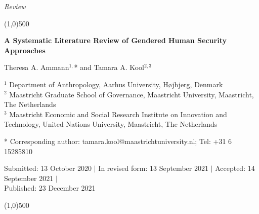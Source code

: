 \documentclass[10pt,a4paper]{article}
\begin{document}
\flushcolumns
\raggedcolumns



\pagestyle{document}
\thispagestyle{firstpage}


\vspace*{70pt}

\setlength{\parindent}{0cm}
\textit{Review}
\vspace*{-12pt}

\begin{center}
\line(1,0){500}
\end{center}

\vspace*{12pt}
\begin{flushleft}
\begin{LARGE}
\textbf{{\color{LibrelloColor} A Systematic Literature Review of Gendered Human Security Approaches}} 
\end{LARGE}

\vspace*{12pt}

Theresa A. Ammann$^{1,}$* and Tamara A. Kool$^{2,3}$

\vspace*{6pt}

$^1$ Department of Anthropology, Aarhus University, H{\o}jbjerg, Denmark \\
$^2$ Maastricht Graduate School of Governance, Maastricht University, Maastricht, The Netherlands \\
$^3$ Maastricht Economic and Social Research Institute on Innovation and Technology, United Nations University, Maastricht, The Netherlands

\vspace*{6pt}

* Corresponding author: tamara.kool@maastrichtuniversity.nl; Tel: +31 6 15285810

\vspace*{6pt}

Submitted: 13 October 2020 $\mid$ In revised form: 13 September 2021 $\mid$ Accepted: 14 September 2021 $\mid$ \\
Published: 23 December 2021
\end{flushleft}
\setcounter{page}{91}


\vspace*{-18pt}
\begin{center}
\line(1,0){500}
\end{center}

\vspace*{12pt}
\end{document}
